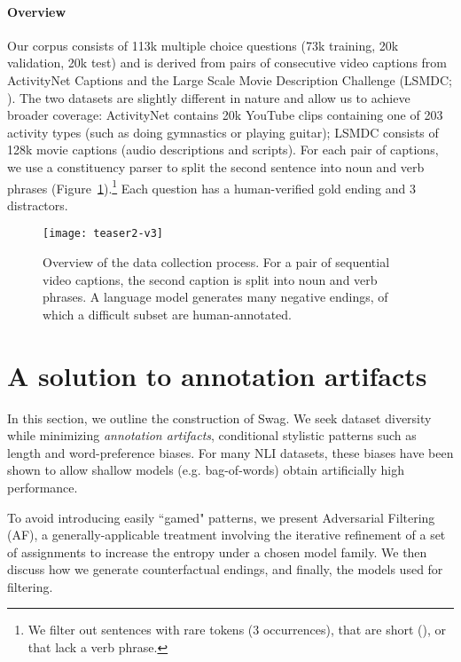 \documentclass[11pt,a4paper]{article}
\newcommand\customfont[1]{{\usefont{T1}{perm}{m}{n}#1}}
\newcommand{\datasetname}{{\small\customfont{Swag}}}
\begin{document}
\paragraph{Overview} Our corpus consists of 113k multiple choice questions (73k training, 20k validation, 20k test) and is derived from pairs of consecutive video captions from ActivityNet Captions \cite{krishna_dense-captioning_2017,caba2015activitynet} and the Large Scale Movie Description Challenge (LSMDC; \citealp{rohrbach_movie_2017}). The two datasets are slightly different in nature and allow us to achieve broader coverage: ActivityNet contains 20k YouTube clips containing one of 203 activity types (such as doing gymnastics or playing guitar); LSMDC consists of 128k movie captions (audio descriptions and scripts). For each pair of captions, we use a constituency parser \cite{stern2017minimal} to split the second sentence into noun and verb phrases (Figure~\ref{fig:teaser}).\footnote{We filter out sentences with rare tokens (3 occurrences), that are short (), or that lack a verb phrase.} Each question has a human-verified gold ending and 3 distractors. 

\begin{figure}
\texttt{[image: teaser2-v3]}
\caption{Overview of the data collection process. For a pair of sequential video captions, the second caption is split into noun and verb phrases. A language model generates many negative endings, of which a difficult subset are human-annotated.
}
  \label{fig:teaser}
\end{figure}
 
\section{A solution to annotation artifacts}
In this section, we outline the construction of \datasetname. We seek dataset diversity while minimizing \emph{annotation artifacts}, conditional stylistic patterns such as length and word-preference biases. For many NLI datasets, these biases have been shown to allow shallow models (e.g. bag-of-words) obtain artificially high performance. 

To avoid introducing easily ``gamed" patterns, we present Adversarial Filtering (AF), a generally-applicable treatment involving the iterative refinement of a set of assignments to increase the entropy under a chosen model family. We then discuss how we generate counterfactual endings, and finally, the models used for filtering.
\end{document}
